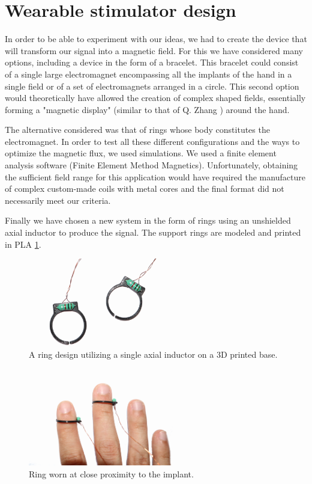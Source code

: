 \documentclass[10pt,journal,compsoc]{IEEEtran}
\begin{document}
\section{Wearable stimulator design}
In order to be able to experiment with our ideas, we had to create the device that will transform our signal into a magnetic field. For this we have considered many options, including a device in the form of a bracelet. This bracelet could consist of a single large electromagnet encompassing all the implants of the hand in a single field or of a set of electromagnets arranged in a circle. This second option would theoretically have allowed the creation of complex shaped fields, essentially forming a "magnetic display" (similar to that of Q. Zhang \cite{zhang2016ieee}) around the hand.

The alternative considered was that of rings whose body constitutes the electromagnet. In order to test all these different configurations and the ways to optimize the magnetic flux, we used simulations. We used a finite element analysis software (Finite Element Method Magnetics). Unfortunately, obtaining the sufficient field range for this application would have required the manufacture of complex custom-made coils with metal cores and the final format did not necessarily meet our criteria.

Finally we have chosen a new system in the form of rings using an unshielded axial inductor to produce the signal. The support rings are modeled and printed in PLA \ref{PLARings}.

	
	\begin{figure}[!t]
		\centering
		\includegraphics[width=2.5in]{PLARings}
		\caption{A ring design utilizing a single axial inductor on a 3D printed base.}
		\label{PLARings}
	\end{figure}	
	
	\begin{figure}[!t]
		\centering
		\includegraphics[width=2.5in]{FingersWithRings}
		\caption{Ring worn at close proximity to the implant.}
		\label{FingersWithRings}
\end{figure}
\end{document}
